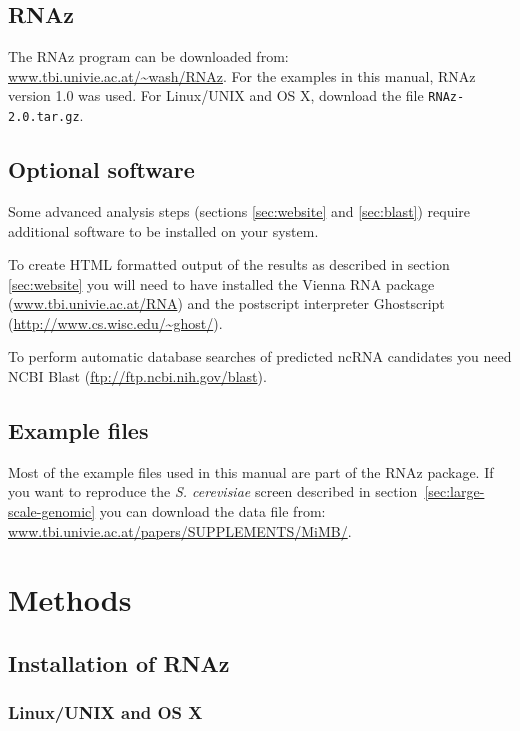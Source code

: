 \documentclass[11pt]{article}
\begin{document}
\subsection{RNAz}

The RNAz program can be downloaded from:
\url{www.tbi.univie.ac.at/~wash/RNAz}. For the examples in this manual,
RNAz version 1.0 was used. For Linux/UNIX and OS X, download the file
\texttt{RNAz-2.0.tar.gz}. 

\subsection{Optional software}
\label{sec:optional-software}

Some advanced analysis steps (sections \ref{sec:website} and
\ref{sec:blast}) require additional software to be installed on your
system.

To create HTML formatted output of the results as described in section
\ref{sec:website} you will need to have installed the Vienna RNA package
(\url{www.tbi.univie.ac.at/RNA}) and the postscript interpreter Ghostscript
(\url{http://www.cs.wisc.edu/~ghost/}).

To perform automatic database searches of predicted ncRNA candidates you
need NCBI Blast (\url{ftp://ftp.ncbi.nih.gov/blast}).

\subsection{Example files}

Most of the example files used in this manual are part of the RNAz
package. If you want to reproduce the \emph{S. cerevisiae} screen described
in section~\ref{sec:large-scale-genomic} you can download the data file
from: \url{www.tbi.univie.ac.at/papers/SUPPLEMENTS/MiMB/}.

\section{Methods}

\subsection{Installation of RNAz}

\subsubsection{Linux/UNIX and OS X}
\end{document}
